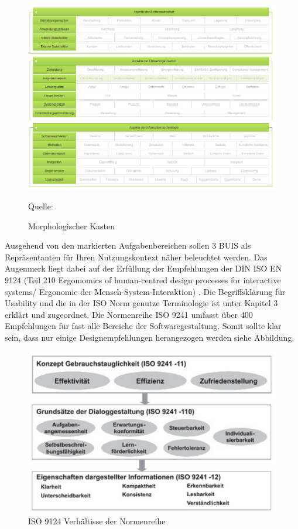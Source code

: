 \documentclass[a4paper, 12pt, twoside, BCOR=20mm, DIV=calc, abstracton, parskip=half*, toc=bibliography, toc=listof, headsepline, footsepline, headings=small, numbers=enddot]{scrreprt}
\newcommand*{\quelle}{%
  \footnotesize Quelle: 
}
\begin{document}
	\begin{figure}[h!]
		\includegraphics[width=\textwidth]{Bild/Morphologischer_Kasten_BUIS_Talus.png}
		\caption{Morphologischer Kasten}
		\quelle{}
	\end{figure}
	
	Ausgehend von den markierten Aufgabenbereichen sollen 3 \ac{BUIS} als Repräsentanten für Ihren Nutzungskontext näher beleuchtet werden. Das Augenmerk liegt dabei auf der Erfüllung der Empfehlungen der DIN ISO EN 9124 (Teil 210 Ergomomics of human-centred design processes for interactive systems/ Ergonomie der Mensch-System-Interaktion) \cite{ISO9241}. Die Begriffsklärung für Usability und die in der ISO Norm genutze Terminologie ist unter Kapitel 3 erklärt und zugeordnet. Die Normenreihe ISO 9241 umfasst über 400 Empfehlungen für fast alle Bereiche der Softwaregestaltung. Somit sollte klar sein, dass nur einige Designempfehlungen herangezogen werden siehe Abbildung.
	\begin{figure}[ht]
			\centering
			\includegraphics[width=\textwidth]{Bild/Normenteile ISO 9241-11, 9241-110, 9241-12 Dialoggestaltung Software-Ergonomie.png}
			\caption[ISO 9124 Verhältisse der Normenreihe]{ISO 9124 Verhältisse der Normenreihe\cite{ISO9241Bild}} 
		\end{figure}
\end{document}

